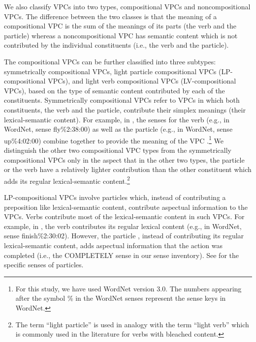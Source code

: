 \documentclass[output=paper,modfonts,nonflat]{langsci/langscibook}
\begin{document}
We also classify VPCs into two types, compositional VPCs and noncompositional VPCs. The difference between the two classes is that the meaning of a compositional VPC is the sum of the meanings of its parts (the verb and the particle) whereas a noncompositional VPC %
has semantic content which is not contributed by the individual constituents (i.e., the verb and the particle). 

The compositional VPCs can be further classified into three subtypes: symmetrically compositional VPCs, light particle compositional VPCs (LP-compositional VPCs), and light verb compositional VPCs (LV-compositional VPCs), based on the type of semantic content contributed by each of the constituents. Symmetrically compositional VPCs refer to VPCs in which both constituents, the verb and the particle, contribute their simplex meanings (their lexical-semantic content). For example, in , the senses for the verb  (e.g., in WordNet, sense fly\%2:38:00) as well as the particle  (e.g., in WordNet, sense up\%4:02:00) combine together to provide the meaning of the VPC .\footnote{For this study, we have used WordNet version 3.0. The numbers appearing after the symbol \% in the WordNet senses represent the sense keys in WordNet.} We distinguish the other two compositional VPC types from the symmetrically compositional VPCs only in the aspect that in the other two types, the particle or the verb have a relatively lighter contribution than the other constituent which adds its regular lexical-semantic content.\footnote{The term ``light particle'' is used in analogy with the term ``light verb'' which is commonly used in the literature for verbs with bleached content.} 

LP-compositional VPCs involve particles which, instead of contributing a pre\-position like lexical-semantic content, contribute aspectual information to the VPCs. Verbs contribute most of the lexical-semantic content in such VPCs. For example, in  \citep{Ban03b}, the verb  contributes its regular lexical content (e.g., in WordNet, sense finish\%2:30:02). However, the particle , instead of contributing its regular lexical-semantic content, adds aspectual information that the action was completed (i.e., the COMPLETELY sense in our sense inventory). See  for the specific senses of particles. 
\end{document}
